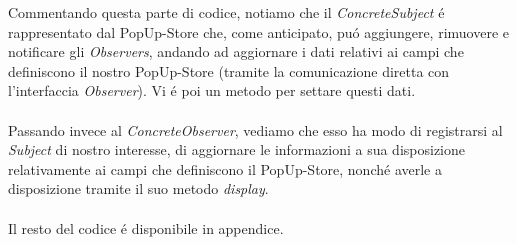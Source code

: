 \documentclass[12pt]{article}
\begin{document}
Commentando questa parte di codice, notiamo che il \textit{ConcreteSubject} \'e rappresentato dal PopUp-Store che, come anticipato, pu\'o aggiungere, rimuovere e notificare gli \textit{Observers}, andando ad aggiornare i dati relativi ai campi che definiscono il nostro PopUp-Store (tramite la comunicazione diretta con l'interfaccia \textit{Observer}). Vi \'e poi un metodo per settare questi dati. 
\\
\\
Passando invece al \textit{ConcreteObserver}, vediamo che esso ha modo di registrarsi al \textit{Subject} di nostro interesse, di aggiornare le informazioni a sua disposizione relativamente ai campi che definiscono il PopUp-Store, nonch\'e averle a disposizione tramite il suo metodo \textit{display}. 
\\
\\
Il resto del codice \'e disponibile in appendice.


\newpage

\printbibliography
\end{document}
